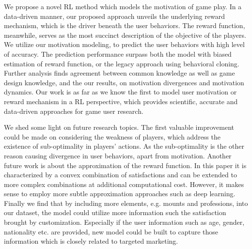 \documentclass{sigchi}
\begin{document}
We propose a novel RL method which models the motivation of game play.
In a data-driven manner, our proposed approach unveils the underlying reward mechanism, which is the driver beneath the user behaviors.
The reward function, meanwhile, serves as the most succinct description of the objective of the players.
We utilize our motivation modeling, to predict the user behaviors with high level of accuracy.
The prediction performance surpass both the model with biased estimation of reward function, or the legacy approach using behavioral cloning.
Further analysis finds agreement between common knowledge as well as game design knowledge, and the our results, on motivation divergences and motivation dynamics.
Our work is as far as we know the first to model user motivation or reward mechanism in a RL perspective, which provides scientific, accurate and data-driven approaches for game user research.

We shed some light on future research topics.
The first valuable improvement could be made on considering the weakness of players, which address the existence of sub-optimality in players' actions.
As the sub-optimality is the other reason causing divergence in user behaviors, apart from motivation.
Another future work is about the approximation of the reward function.
In this paper it is characterized by a convex combination of satisfactions and can be extended to more complex combinations at additional computational cost.
However, it makes sense to employ more subtle approximation approaches such as deep learning.
Finally we find that by including more elements, e.g. mounts and professions, into our dataset, the model could utilize more information such the satisfaction brought by customization.
Especially if the user information such as age, gender, nationality etc. are provided, new model could be built to capture those information which is closely related to targeted marketing.



\end{document}
